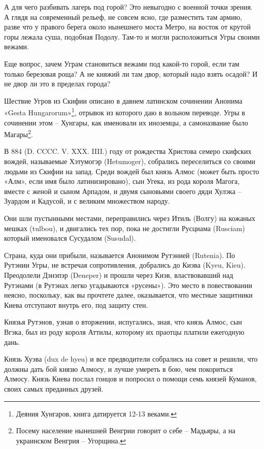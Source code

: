 А для чего разбивать лагерь под горой? Это невыгодно с военной точки зрения. А глядя на современный рельеф, не совсем ясно, где разместить там армию, разве что у правого берега около нынешнего моста Метро, на восток от крутой горы лежала суша, подобная Подолу. Там-то и могли расположиться Угры своими вежами.

Еще вопрос, зачем Уграм становиться вежами под какой-то горой, если там только березовая роща? А не княжий ли там двор, который надо взять осадой? И не двор ли это в пределах города?

Шествие Угров из Скифии описано в давнем латинском сочинении Анонима «Gesta Hungarorum»\footnote{Деяния Хунгаров, книга датируется 12-13 веками.}, отрывок из которого даю в вольном переводе. Угры в сочинении этом – Хунгары, как именовали их иноземцы, а самоназвание было Магары\footnote{Посему население нынешней Венгрии говорит о себе – Мадьяры, а на украинском Венгрия – Угорщина.}.

В 884 (D. CCCC. V. XXX. IIII.) году от рождества Христова семеро скифских вождей, называемые Хэтумогэр (Hetumoger), собрались переселиться со своими людьми из Скифии на запад. Среди вождей был князь Алмос (может быть просто «Алм», если имя было латинизировано), сын Угека, из рода короля Магога, вместе с женой и сыном Арпадом, и двумя сыновьями своего дяди Хулэка – Зуардом и Кадусой, и с великим множеством народу.

Они шли пустынными местами, переправились через Итиль (Волгу) на кожаных мешках (tulbou), и двигались тех пор, пока не достигли Русциама (Rusciam) который именовался Сусудалом (Susudal).

Страна, куда они прибыли, называется Анонимом Рутэнией (Rutenia). По Рутэнии Угры, не встречая сопротивления, добрались до Киэва (Kyeu, Kieu). Преодолели Дэнэпэр (Deneper) и прошли через Киэв, властвовавший над Рутэнами (в Рутэнах легко угадываются «русены»). Это место в повествовании неясно, поскольку, как вы прочтете далее, оказывается, что местные защитники Киева отступают внутрь его, под защиту стен.

Князья Рутэнов, узнав о вторжении, испугались, зная, что князь Алмос, сын Вгэка, был из роду короля Аттилы, которому их праотцы платили ежегодную дань.

Князь Хуэва (dux de hyeu) и все предводители собрались на совет и решили, что должны дать бой князю Алмосу, и лучше умереть в бою, чем покориться Алмосу. Князь Киева послал гонцов и попросил о помощи семь князей Куманов, своих самых преданных друзей.

